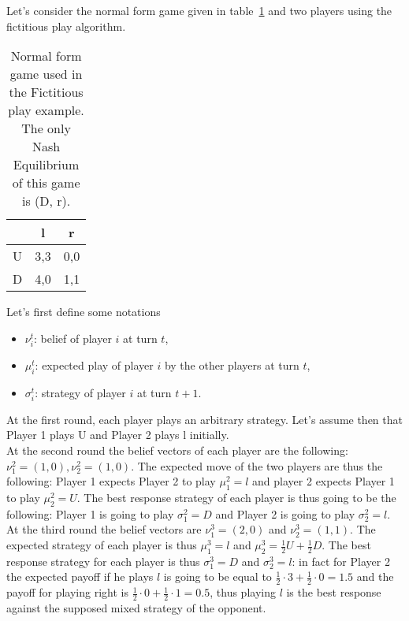 \begin{example}
\label{ex:fictitiousPlay}
Let's consider the normal form game given in table~\ref{chap9:tab-fic-play-ex} and
two players using the fictitious play algorithm.

\begin{table}
    \centering
    \begin{tabular}{c|cc}
        & l & r \\
        \hline
        U & 3,3 & 0,0 \\
        D & 4,0 & 1,1 \\
    \end{tabular}
    \caption{Normal form game used in the Fictitious play example. The only
    Nash Equilibrium of this game is (D, r).}
    \label{chap9:tab-fic-play-ex}
\end{table}

Let's first define some notations
\begin{itemize}
        \item $\nu_i^t$: belief of player $i$ at turn $t$,
        \item $\mu_i^t$: expected play of player $i$ by the other players at turn $t$,
        \item $\sigma_i^t$: strategy of player $i$ at turn $t+1$.
\end{itemize}

At the first round, each player plays an arbitrary strategy.
Let's assume then that Player 1 plays U and Player 2 plays l initially.\\

At the second round the belief vectors of each player are the following:
$\nu_1^2=(1,0), \nu_2^2=(1,0)$. The expected move of the two players are
thus the following: Player 1 expects Player 2 to play $\mu_1^2=l$ and player
2 expects Player 1 to play $\mu_2^2=U$. The best response strategy of each
player is thus going to be the following: Player 1 is going to play
$\sigma_1^2=D$ and Player 2 is going to play $\sigma_2^2=l$.\\

At the third round the belief vectors are $\nu_1^3=(2,0)$ and $\nu_2^3=(1,1)$.
The expected strategy of each player is thus $\mu_1^3=l$ and
$\mu_2^3=\frac{1}{2}U+\frac{1}{2}D$. The best response strategy for each
player is thus $\sigma_1^3=D$ and $\sigma_2^3=l$: in fact for Player 2 the
expected payoff if  he plays $l$ is going to be equal to
$\frac{1}{2}\cdot3+\frac{1}{2}\cdot0=1.5$ and the payoff for playing right is
$\frac{1}{2}\cdot0+\frac{1}{2}\cdot1=0.5$, thus playing $l$ is the best response
against the supposed mixed strategy of the opponent.\\


\end{example}
